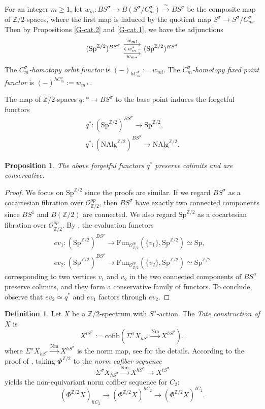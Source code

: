 \documentclass[10pt]{amsart}
\newtheorem{prop}[thm]{Proposition}
\theoremstyle{definition}
\newtheorem{df}[thm]{Definition}
\numberwithin{equation}{section}
\newcommand{\Z}{\mathbb{Z}}
\newcommand{\cO}{\mathcal{O}}
\newcommand{\ul}{\underline}
\newcommand{\Fun}{\mathrm{Fun}}
\newcommand{\NAlg}{\mathrm{NAlg}}
\newcommand{\Sp}{\mathrm{Sp}}
\newcommand{\cofib}{\mathrm{cofib}}
\newcommand{\Nm}{\mathrm{Nm}}
\begin{document}
{For an integer $m\geq 1$, let $w_m\colon BS^\sigma\to B(S^\sigma/C_m^\sigma)\xrightarrow{\simeq} BS^\sigma$ be the composite map of $\Z/2$-spaces,
where the first map is induced by the quotient map $S^\sigma\to S^\sigma/C_m^\sigma$.
Then by Propositions \ref{G-cat.2} and \ref{G-cat.1},
we have the adjunctions
\[
\begin{tikzcd}
(\Sp^{\Z/2})^{B S^\sigma}
\ar[r,shift left=1.5ex,"w_{m!}"]
\ar[r,"w_m^*" description,leftarrow]
\ar[r,"w_{m*}"',shift right=1.5ex]
&
(\Sp^{\Z/2})^{B S^\sigma}
\end{tikzcd}
\]
The \emph{$C_m^\sigma$-homotopy orbit functor} is $(-)_{hC_m^\sigma}:=w_{m!}$.
The \emph{$C_m^\sigma$-homotopy fixed point functor} is $(-)^{hC_m^\sigma}:=w_{m*}$.

The map of $\Z/2$-spaces $q\colon *\to B S^\sigma$ to the base point induces the forgetful functors
\begin{gather*}
q^*\colon (\Sp^{\Z/2})^{BS^\sigma}\to \Sp^{\Z/2},
\\
q^*\colon (\NAlg^{\Z/2})^{BS^\sigma}\to \NAlg^{\Z/2}.
\end{gather*}

\begin{prop}
\label{G-cat.3}
The above forgetful functors $q^*$ preserve colimits and are conservative.
\end{prop}
\begin{proof}
We focus on $\Sp^{\Z/2}$ since the proofs are similar.
If we regard $BS^\sigma$ as a cocartesian fibration over $\cO_{\Z/2}^{op}$,
then $BS^\sigma$ have exactly two connected components since $BS^1$ and $B(\Z/2)$ are connected.
We also regard $\ul{\Sp}^{\Z/2}$ as a cocartesian fibration over $\cO_{\Z/2}^{op}$.
By \cite[Corollary 5.1.2.3]{HTT},
the evaluation functors
\begin{gather*}
ev_1\colon 
(\Sp^{\Z/2})^{BS^\sigma}
\to
\Fun_{\cO_{\Z/2}^{op}}({\{v_1\},\ul{\Sp}^{\Z/2}})
\simeq
\Sp,
\\
ev_2\colon 
(\Sp^{\Z/2})^{BS^\sigma}
\to
\Fun_{\cO_{\Z/2}^{op}}({\{v_2\},\ul{\Sp}^{\Z/2}})
\simeq
\Sp^{\Z/2}
\end{gather*}
corresponding to two vertices $v_1$ and $v_2$ in the two connected components of $BS^\sigma$
preserve colimits,
and they form a conservative family of functors.
To conclude, observe that $ev_2\simeq q^*$ and $ev_1$ factors through $ev_2$.
\end{proof}

\begin{df}
\label{remind.1}
Let $X$ be a $\Z/2$-spectrum with $S^\sigma$-action.
The \emph{Tate construction of $X$} is
\[
X^{tS^\sigma}
:=
\cofib(
\Sigma^\sigma X_{hS^\sigma}\xrightarrow{\Nm} X^{hS^\sigma}),
\]
where $\Sigma^\sigma X_{hS^\sigma}\xrightarrow{\Nm}X^{hS^\sigma}$ is the norm map,
see \cite[Example 5.58]{QS21} for the details.
According to the proof of \cite[Lemma 4.6]{QS22},
taking $\Phi^{\Z/2}$ to the \emph{norm cofiber sequence}
\[
\Sigma^\sigma X_{hS^\sigma}\xrightarrow{\Nm} X^{hS^\sigma}\to X^{tS^\sigma}
\]
yields the non-equivariant norm cofiber sequence for $C_2$:
\[
(\Phi^{\Z/2} X)_{hC_2}
\to
(\Phi^{\Z/2} X)^{hC_2}
\to
(\Phi^{\Z/2} X)^{tC_2}.
\]


\end{df}}
\end{document}
